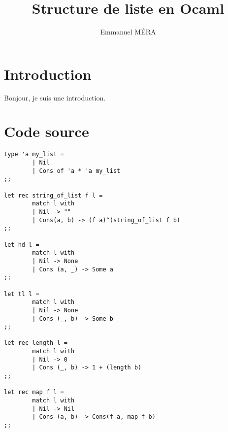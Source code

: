 \documentclass[12pt,a4paper]{article}
\author{Emmanuel MÉRA}
\title{Structure de liste en Ocaml}
\newenvironment{longlisting}{\captionsetup{type=listing, width=\linewidth}}{}
\begin{document}
\maketitle
\section{Introduction}
	Bonjour, je suis une introduction.
\section{Code source}
	\begin{longlisting}
	\begin{verbatim}
type 'a my_list =
        | Nil
        | Cons of 'a * 'a my_list
;;

let rec string_of_list f l =
        match l with
        | Nil -> ""
        | Cons(a, b) -> (f a)^(string_of_list f b)
;;

let hd l =
        match l with
        | Nil -> None
        | Cons (a, _) -> Some a
;;

let tl l =
        match l with
        | Nil -> None
        | Cons (_, b) -> Some b
;;

let rec length l =
        match l with
        | Nil -> 0
        | Cons (_, b) -> 1 + (length b)
;;

let rec map f l =
        match l with
        | Nil -> Nil
        | Cons (a, b) -> Cons(f a, map f b)
;;
	\end{verbatim}
	\end{longlisting}
	
\end{document}

